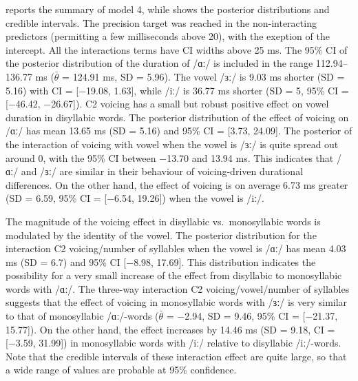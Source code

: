 \documentclass[
  12pt,
  a4paper,
]{article}
\begin{document}
 reports the summary of model 4, while
 shows the posterior distributions and credible
intervals. The precision target was reached in the non-interacting
predictors (permitting a few milliseconds above 20), with the exeption
of the intercept. All the interactions terms have CI widths above 25 ms.
The 95\% CI of the posterior distribution of the duration of /ɑː/ is
included in the range 112.94--136.77 ms (\(\bar{\theta}\) = 124.91 ms,
SD = 5.96). The vowel /ɜː/ is 9.03 ms shorter (SD = 5.16) with CI =
{[}−19.08, 1.63{]}, while /iː/ is 36.77 ms shorter (SD = 5, 95\% CI =
{[}−46.42, −26.67{]}). C2 voicing has a small but robust positive effect
on vowel duration in disyllabic words. The posterior distribution of the
effect of voicing on /ɑː/ has mean 13.65 ms (SD = 5.16) and 95\% CI =
{[}3.73, 24.09{]}. The posterior of the interaction of voicing with
vowel when the vowel is /ɜː/ is quite spread out around 0, with the 95\%
CI between −13.70 and 13.94 ms. This indicates that /ɑː/ and /ɜː/ are
similar in their behaviour of voicing-driven durational differences. On
the other hand, the effect of voicing is on average 6.73 ms greater (SD
= 6.59, 95\% CI = {[}−6.54, 19.26{]}) when the vowel is /iː/.

The magnitude of the voicing effect in disyllabic vs.~monosyllabic words
is modulated by the identity of the vowel. The posterior distribution
for the interaction C2 voicing/number of syllables when the vowel is
/ɑː/ has mean 4.03 ms (SD = 6.7) and 95\% CI {[}−8.98, 17.69{]}. This
distribution indicates the possibility for a very small increase of the
effect from disyllabic to monosyllabic words with /ɑː/. The three-way
interaction C2 voicing/vowel/number of syllables suggests that the
effect of voicing in monosyllabic words with /ɜː/ is very similar to
that of monosyllabic /ɑː/-words (\(\bar{\theta}\) = −2.94, SD = 9.46,
95\% CI = {[}−21.37, 15.77{]}). On the other hand, the effect increases
by 14.46 ms (SD = 9.18, CI = {[}−3.59, 31.99{]}) in monosyllabic words
with /iː/ relative to disyllabic /iː/-words. Note that the credible
intervals of these interaction effect are quite large, so that a wide
range of values are probable at 95\% confidence.
\end{document}
